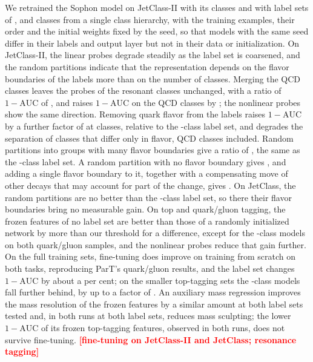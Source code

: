 \documentclass[11pt]{article}
\newcommand{\pending}[1]{\textcolor{red}{\textbf{[#1]}}}
\newcommand{\Kfull}{\VocabSizeLoneeighteight}
\newcommand{\Kres}{\VocabSizeLonesixtwo}
\newcommand{\Kmid}{\VocabSizeRfourtwoQone}
\newcommand{\Kcoarse}{\VocabSizeRonesixQone}
\newcommand{\oma}{\ensuremath{1-\mathrm{AUC}}}
\begin{document}
We retrained the Sophon model on JetClass-II with its \Kfull{} classes and with label sets of
\Kres, \Kmid{} and \Kcoarse{} classes from a single class hierarchy, with the training
examples, their order and the initial weights fixed by the seed, so that models with the same
seed differ in their labels and output layer but not in their data or initialization. On
JetClass-II, the linear probes degrade steadily as the label set is coarsened, and the random
partitions indicate that the representation depends on the flavor boundaries of the labels more
than on the number of classes. Merging the QCD classes leaves the probes of the resonant classes
unchanged, with a ratio of $\oma$ of \MlstCmpJcTwoResResOverFull, and raises $\oma$ on the QCD
classes by \MlstCmpJcTwoQcdResOverFull; the nonlinear probes show the same direction. Removing
quark flavor from the labels raises $\oma$ by a further factor of \MlstCmpJcTwoCoarseOverRes{} at
\Kcoarse{} classes, relative to the \Kres-class label set, and degrades the separation of classes
that differ only in flavor, QCD classes included. Random partitions into \Kcoarse{} groups with
many flavor boundaries give a ratio of \MlstCmpJcTwoRandOverFull, the same as the
\Kmid-class label set. A random partition with no flavor boundary gives
\MlstCmpJcTwoFzeroOverFull, and adding a single flavor boundary to it, together with a
compensating move of other decays that may account for part of the change, gives
\MlstCmpJcTwoFoneOverFull. On JetClass, the random partitions are no better than the
\Kcoarse-class label set, so there their flavor boundaries bring no measurable gain. On top and
quark/gluon tagging, the frozen features of no label set are better than those of a randomly
initialized network by more than our threshold for a difference, except for the \Kfull-class
models on both quark/gluon samples, and the nonlinear probes reduce that gain further. On the
full training sets, fine-tuning does improve on training from scratch on both tasks, reproducing
ParT's quark/gluon results, and the label set changes $\oma$ by about a per cent; on the smaller
top-tagging sets the \Kcoarse-class models fall further behind, by up to a factor of
\MlstFtCmpTopCoarseOverFullEFour. An auxiliary mass
regression improves the mass resolution of the frozen features by a similar amount at both label
sets tested and, in both runs at both label sets, reduces mass sculpting; the lower $\oma$ of its
frozen top-tagging features, observed in both runs, does not survive fine-tuning. \pending{fine-tuning on JetClass-II and JetClass; resonance tagging}
\end{document}

